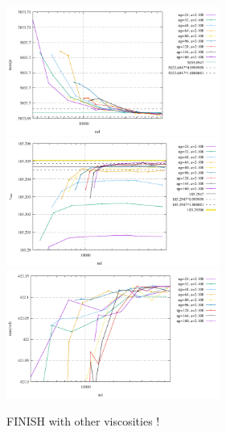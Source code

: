 \begin{center}
\includegraphics[width=7cm]{python_codes/fieldstone_93/results_exp4/max_p}\\
\includegraphics[width=7cm]{python_codes/fieldstone_93/results_exp4/vrms}
\includegraphics[width=7cm]{python_codes/fieldstone_93/results_exp4/max_vel}\\
\end{center}

FINISH with other viscosities !













